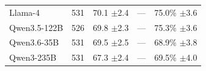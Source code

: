 \begin{table}[t]
\begin{tabular*}{\textwidth}{@{\extracolsep{\fill}}lrrrr@{}}
Llama-4 & 531 & \shortstack[r]{70.1\\{\scriptsize $\pm$2.4}} & --- & \shortstack[r]{75.0\%\\{\scriptsize $\pm$3.6}} \\
Qwen3.5-122B & 526 & \shortstack[r]{69.8\\{\scriptsize $\pm$2.3}} & --- & \shortstack[r]{75.3\%\\{\scriptsize $\pm$3.6}} \\
Qwen3.6-35B & 531 & \shortstack[r]{69.5\\{\scriptsize $\pm$2.5}} & --- & \shortstack[r]{68.9\%\\{\scriptsize $\pm$3.8}} \\
Qwen3-235B & 531 & \shortstack[r]{67.3\\{\scriptsize $\pm$2.4}} & --- & \shortstack[r]{69.5\%\\{\scriptsize $\pm$4.0}} \\
\bottomrule
\end{tabular*}
\end{table}
